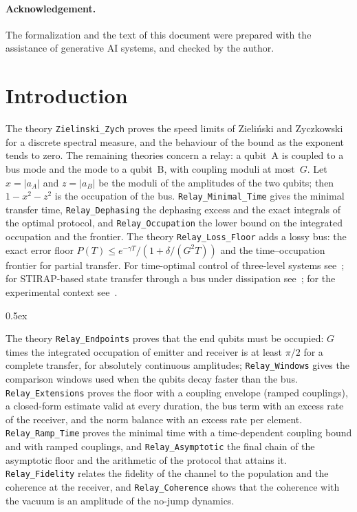 \documentclass[10pt,a4paper]{article}
\begin{document}
\paragraph{Acknowledgement.} The formalization and the text of this document were prepared with the
assistance of generative AI systems, and checked by the author.

\tableofcontents

\section*{Introduction}

The theory \texttt{Zielinski\_Zych} proves the speed limits of Zieli\'nski and Zyczkowski~\cite{ZZ06} for a discrete
spectral measure, and the behaviour of the bound as the exponent tends to zero. The remaining theories concern a relay:
a qubit~A is coupled to a bus mode and the mode to a qubit~B, with coupling moduli at most~$G$. Let $x=|a_A|$ and
$z=|a_B|$ be the moduli of the amplitudes of the two qubits; then $1-x^2-z^2$ is the occupation of the bus.
\texttt{Relay\_Minimal\_Time} gives the minimal transfer time, \texttt{Relay\_Dephasing} the dephasing excess and
the exact integrals of the optimal protocol, and \texttt{Relay\_Occupation} the lower bound on the integrated
occupation and the frontier. The theory \texttt{Relay\_Loss\_Floor} adds a lossy bus: the exact error floor
$P(T)\le e^{-\gamma T}/(1+\delta/(G^2T))$ and the time--occupation frontier for partial transfer. For time-optimal control of three-level systems see~\cite{BCC05}; for STIRAP-based
state transfer through a bus under dissipation see~\cite{WYC17}; for the experimental context
see~\cite{SUN26,MAR26}.

\parindent 0pt\parskip 0.5ex

\begin{sloppypar}
The theory \texttt{Relay\_Endpoints} proves that the end qubits must be occupied: $G$ times the
integrated occupation of emitter and receiver is at least $\pi/2$ for a complete transfer, for
absolutely continuous amplitudes; \texttt{Relay\_Windows} gives the comparison windows used when the
qubits decay faster than the bus. \texttt{Relay\_Extensions} proves the floor with a coupling envelope
(ramped couplings), a closed-form estimate valid at every duration, the bus term with an excess rate of the
receiver, and the norm balance with an excess rate per element. \texttt{Relay\_Ramp\_Time} proves the minimal time with a time-dependent coupling bound and with ramped
couplings, and \texttt{Relay\_Asymptotic} the final chain of the asymptotic floor and the arithmetic of the protocol
that attains it. \texttt{Relay\_Fidelity} relates the fidelity of the channel to the population and the coherence at the
receiver, and \texttt{Relay\_Coherence} shows that the coherence with the vacuum is an amplitude of the
no-jump dynamics.
\end{sloppypar}





\end{document}
